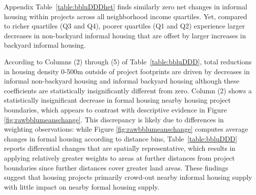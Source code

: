 \documentclass[12pt]{article}
\begin{document}
Appendix Table~\ref{table:bbluDDDhet} finds similarly zero net changes in informal housing within projects across all neighborhood income quartiles.  Yet, compared to richer quartiles (Q3 and Q4), poorer quartiles (Q1 and Q2) experience larger decreases in non-backyard informal housing that are offset by larger increases in backyard informal housing.

According to Columns (2) through (5) of Table~\ref{table:bbluDDD}, total reductions in housing density 0-500m outside of project footprints are driven by decreases in informal non-backyard housing and informal backyard housing although these coefficients are statistically insignificantly different from zero.  Column (2) shows a statistically insignificant decrease in formal housing nearby housing project boundaries, which appears to contrast with descriptive evidence in Figure \ref{fig:rawbblumeanschange}.  This discrepancy is likely due to differences in weighting observations: while Figure \ref{fig:rawbblumeanschange} computes average changes in formal housing according to distance bins, Table~\ref{table:bbluDDD} reports differential changes that are spatially representative, which results in applying relatively greater weights to areas at further distances from project boundaries since further distances cover greater land areas.  These findings suggest that housing projects primarily crowd-out nearby informal housing supply with little impact on nearby formal housing supply.


\end{document}
